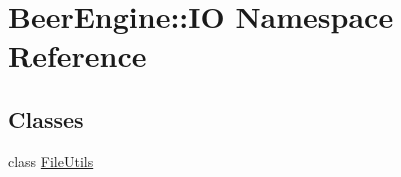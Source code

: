 \hypertarget{namespace_beer_engine_1_1_i_o}{}\section{Beer\+Engine\+:\+:IO Namespace Reference}
\label{namespace_beer_engine_1_1_i_o}
\subsection*{Classes}
\begin{DoxyCompactItemize}
\item 
class \mbox{\hyperlink{class_beer_engine_1_1_i_o_1_1_file_utils}{File\+Utils}}
\end{DoxyCompactItemize}

